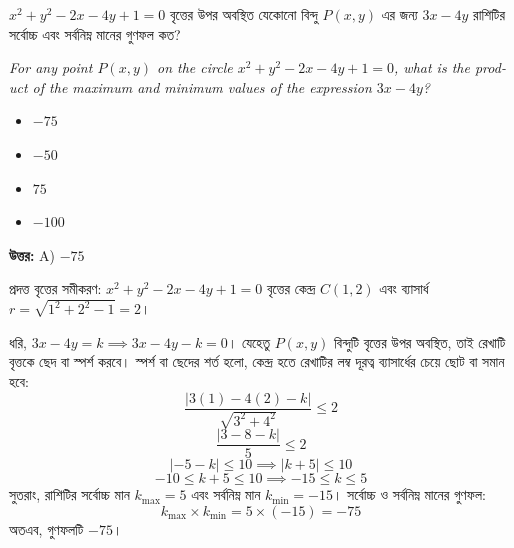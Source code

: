 \documentclass[12pt, a4paper]{article}
\begin{document}
\begin{tcolorbox}[questionbox={প্রশ্ন (Question) 3}]
    \noindent
    $x^2 + y^2 - 2x - 4y + 1 = 0$ বৃত্তের উপর অবস্থিত যেকোনো বিন্দু $P(x, y)$ এর জন্য $3x - 4y$ রাশিটির সর্বোচ্চ এবং সর্বনিম্ন মানের গুণফল কত?
    
    \vspace{0.8em}
    \begin{english}
    \noindent\textit{\color{darkgray}
    For any point $P(x, y)$ on the circle $x^2 + y^2 - 2x - 4y + 1 = 0$, what is the product of the maximum and minimum values of the expression $3x - 4y$?
    }
    \end{english}
\end{tcolorbox}

\begin{itemize}[label={}, leftmargin=1cm, itemsep=0.5em]
    \item[\textbf{A)}] $-75$
    \item[\textbf{B)}] $-50$
    \item[\textbf{C)}] $75$
    \item[\textbf{D)}] $-100$
\end{itemize}

\vspace{0.5em}
\begin{tcolorbox}[answerbox]
    \textbf{\color{success} উত্তর:} A) $-75$
\end{tcolorbox}
\vspace{1em}

\begin{tcolorbox}[solutionbox={সমাধান (Solution)}]
    \noindent
    প্রদত্ত বৃত্তের সমীকরণ: $x^2 + y^2 - 2x - 4y + 1 = 0$
    বৃত্তের কেন্দ্র $C(1, 2)$ এবং ব্যাসার্ধ $r = \sqrt{1^2 + 2^2 - 1} = 2$।
    
    \vspace{0.5em}
    ধরি, $3x - 4y = k \implies 3x - 4y - k = 0$। যেহেতু $P(x, y)$ বিন্দুটি বৃত্তের উপর অবস্থিত, তাই রেখাটি বৃত্তকে ছেদ বা স্পর্শ করবে। স্পর্শ বা ছেদের শর্ত হলো, কেন্দ্র হতে রেখাটির লম্ব দূরত্ব ব্যাসার্ধের চেয়ে ছোট বা সমান হবে:
    \[ \frac{|3(1) - 4(2) - k|}{\sqrt{3^2 + 4^2}} \le 2 \]
    \[ \frac{|3 - 8 - k|}{5} \le 2 \]
    \[ |-5 - k| \le 10 \implies |k + 5| \le 10 \]
    \[ -10 \le k + 5 \le 10 \implies -15 \le k \le 5 \]
    সুতরাং, রাশিটির সর্বোচ্চ মান $k_{\max} = 5$ এবং সর্বনিম্ন মান $k_{\min} = -15$। 
    সর্বোচ্চ ও সর্বনিম্ন মানের গুণফল:
    \[ k_{\max} \times k_{\min} = 5 \times (-15) = -75 \]
    অতএব, গুণফলটি $-75$।
\end{tcolorbox}
\end{document}
